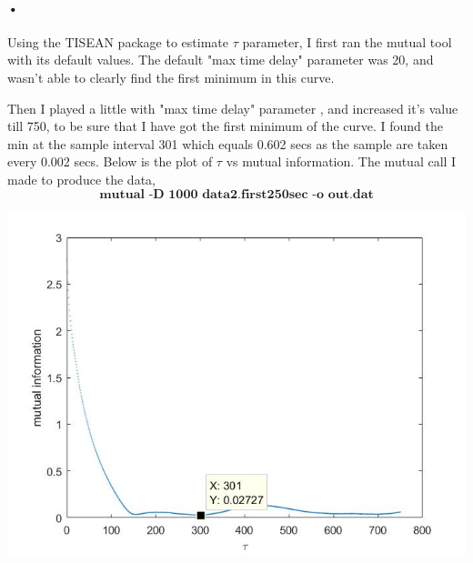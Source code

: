 \documentclass{article}
\begin{document}
\paragraph{•}
Using the TISEAN package to estimate $\tau$ parameter, I first ran the mutual tool with its default values. The default "max time delay" parameter was 20, and wasn't able to clearly find the first minimum in this curve.
\par\medskip
Then I played a little with "max time delay" parameter , and increased it's value till 750, to be sure that I have got the first minimum of the curve. I found the min at the sample interval 301 which equals 0.602 secs as the sample are taken every 0.002 secs. Below is the plot of $\tau$ vs mutual information. The mutual call I made to produce the data,
$$\textbf{mutual -D 1000 data2.first250sec -o out.dat} $$ 
\begin{minipage}{\linewidth}
{
\centering 
\includegraphics[scale=0.45]{images/prob4.jpg}
\label{fig:prob4}
}
\end{minipage}
\end{document}
